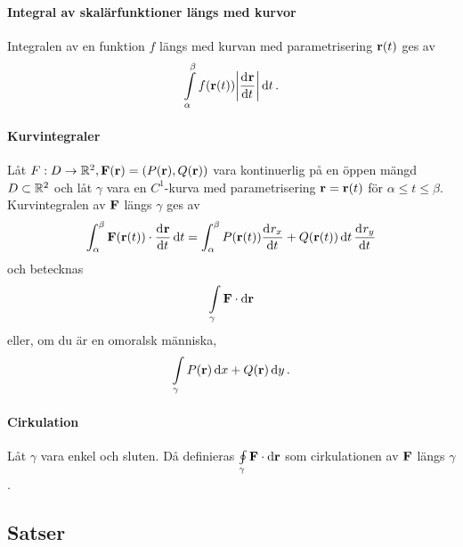 \paragraph{Integral av skalärfunktioner längs med kurvor}
Integralen av en funktion $f$ längs med kurvan med parametrisering $\vect{r}(t)$ ges av
\begin{align*}
	\int\limits_{\alpha}^{\beta}f(\vect{r}(t))\abs{\deval{\vect{r}}{t}{t}}\dd{t}.
\end{align*}

\paragraph{Kurvintegraler}
Låt $F: D\to\R^2, \vect{F}(\vect{r}) = (P(\vect{r}), Q(\vect{r}))$ vara kontinuerlig på en öppen mängd $D\subset\mathbb{R}^2$ och låt $\gamma$ vara en $C^1$-kurva med parametrisering $\vect{r} = \vect{r}(t)$ för $\alpha\leq t\leq\beta$. Kurvintegralen av $\vect{F}$ längs $\gamma$ ges av
\begin{align*}
	\int_{\alpha}^{\beta}\vect{F}(\vect{r}(t))\cdot\deval{\vect{r}}{t}{t}\dd{t} = \int_{\alpha}^{\beta}P(\vect{r}(t))\deval{r_x}{t}{t} + Q(\vect{r}(t))\dd{t}\deval{r_y}{t}{t}
\end{align*}
och betecknas
\begin{align*}
	\cint{\gamma}{\vect{F}}{\vect{r}}
\end{align*}
eller, om du är en omoralsk människa,
\begin{align*}
	\int\limits_{\gamma}P(\vect{r})\dd{x} + Q(\vect{r})\dd{y}.
\end{align*}

\paragraph{Cirkulation}
Låt $\gamma$ vara enkel och sluten. Då definieras $\cint[c]{\gamma}{\vect{F}}{\vect{r}}$ som cirkulationen av $\vect{F}$ längs $\gamma$.

\subsection{Satser}